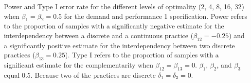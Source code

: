 \begin{table}
\begin{threeparttable}
\begin{tablenotes}
\item Power and Type I error rate for the different levels of optimality (2, 4, 8, 16, 32) when $\beta_1 = \beta_2 = 0.5$ for the demand and performance 1 specification. Power refers to the proportion of samples with a significantly negative estimate for the interdependency between a discrete and a continuous practice ($\beta_{12} = -0.25$) and a significantly positive estimate for the interdependency between two discrete practices ($\beta_{13} = 0.25$). Type I refers to the proportion of samples with a significant estimate for the complementarity when $\beta_{12} = \beta_{13} = 0$. $\beta_1$, $\beta_2$, and $\beta_3$ equal $0.5$. Because two of the practices are discrete $\delta_1 = \delta_3 = 0$.
\end{tablenotes}
\end{threeparttable}
\end{table}